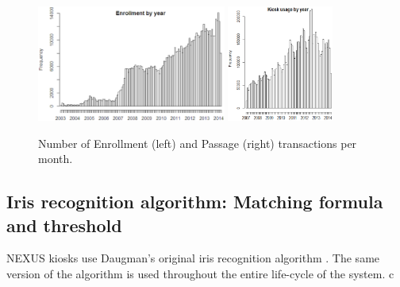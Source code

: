 \documentclass{cta-author}%
\begin{document}
\begin{figure}[!b]
\centering
\includegraphics[height=1.5in, width=0.45\linewidth]{eps/en-by-year0.eps} \quad \quad \quad 
\includegraphics[height=1.5in, width=0.3\linewidth]{eps/pa-by-year0.eps} 

\caption{Number of  Enrollment  (left) and Passage (right) transactions    per month. %
}
\label{ftransactions}
\end{figure}




\subsection{Iris recognition algorithm: %
Matching formula and threshold}
\label{s.NormRule}

NEXUS kiosks 
use  Daugman's original iris recognition algorithm \cite{Daugman2002,Daugman2006}. The same version of the algorithm %
is used throughout the entire life-cycle of the system. 
c

\end{document}
